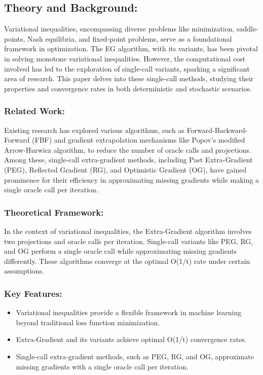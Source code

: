 \documentclass[11pt]{article}
\begin{document}
	\subsection{Theory and Background: }
 
        Variational inequalities, encompassing diverse problems like minimization, saddle-points, Nash equilibria, and fixed-point problems, serve as a foundational framework in optimization. The EG algorithm, with its variants, has been pivotal in solving monotone variational inequalities. However, the computational cost involved has led to the exploration of single-call variants, sparking a significant area of research. This paper delves into these single-call methods, studying their properties and convergence rates in both deterministic and stochastic scenarios.
	
		\subsubsection{Related Work: }
  
        Existing research has explored various algorithms, such as Forward-Backward-Forward (FBF) and gradient extrapolation mechanisms like Popov's modified Arrow-Hurwicz algorithm, to reduce the number of oracle calls and projections. Among these, single-call extra-gradient methods, including Past Extra-Gradient (PEG), Reflected Gradient (RG), and Optimistic Gradient (OG), have gained prominence for their efficiency in approximating missing gradients while making a single oracle call per iteration.
		
		\subsubsection{Theoretical Framework: }
  
        In the context of variational inequalities, the Extra-Gradient algorithm involves two projections and oracle calls per iteration. Single-call variants like PEG, RG, and OG perform a single oracle call while approximating missing gradients differently. These algorithms converge at the optimal O(1/t) rate under certain assumptions.
		
		\subsubsection{Key Features: }
        \begin{itemize}
            \item Variational inequalities provide a flexible framework in machine learning beyond traditional loss function minimization.
            \item Extra-Gradient and its variants achieve optimal O(1/t) convergence rates.
            \item Single-call extra-gradient methods, such as PEG, RG, and OG, approximate missing gradients with a single oracle call per iteration.
        \end{itemize}
		
\end{document}
